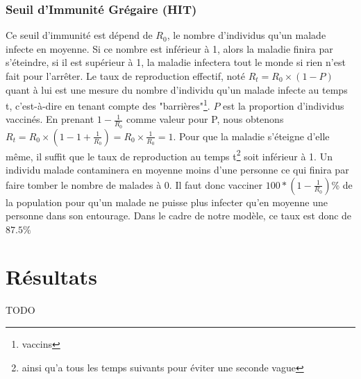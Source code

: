 \documentclass[journal, a4paper]{IEEEtran}
\begin{document}
	\subsubsection{Seuil d'Immunité Grégaire (HIT)}
	Ce seuil d'immunité est dépend de $R_0$, le nombre d'individus qu'un malade infecte en moyenne. Si ce nombre est inférieur à 1, alors la maladie finira par s'éteindre, si il est supérieur à 1, la maladie infectera tout le monde si rien n'est fait pour l'arrêter.
	Le taux de reproduction effectif, noté $R_t = R_0 \times (1-P)$ quant à lui est une mesure du nombre d'individu qu'un malade infecte au temps t, c'est-à-dire en tenant compte des "barrières"\footnote{vaccins}. $P$ est la proportion d'individus vaccinés. En prenant $1-\frac{1}{R_0}$ comme valeur pour P, nous obtenons $R_t = R_0 \times (1-1+\frac{1}{R_0}) = R_0 \times \frac{1}{R_0} = 1$. Pour que la maladie s'éteigne d'elle même, il suffit que le taux de reproduction au temps t\footnote{ainsi qu'a tous les temps suivants pour éviter une seconde vague} soit inférieur à 1. Un individu malade contaminera en moyenne moins d'une personne ce qui finira par faire tomber le nombre de malades à 0. Il faut donc vacciner $100*(1-\frac{1}{R_0})$\% de la population pour qu'un malade ne puisse plus infecter qu'en moyenne une personne dans son entourage.
	Dans le cadre de notre modèle, ce taux est donc de $87.5\%$




\section{Résultats}
	TODO
\end{document}
